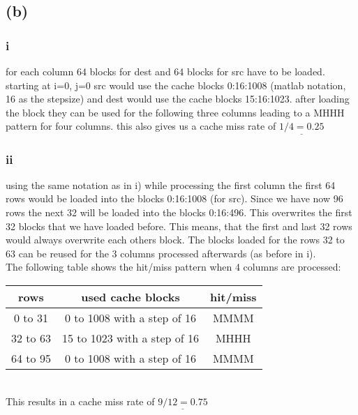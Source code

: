 \documentclass[10pt,a4paper,oneside,notitlepage]{report}
\begin{document}
\subsection*{(b)}
\subsubsection*{i}
for each column 64 blocks for dest and 64 blocks for src have to be loaded. starting at i=0, j=0 src would use the cache blocks 0:16:1008 (matlab notation, 16 as the stepsize) and dest would use the cache blocks 15:16:1023. after loading the block they can be used for the following three columns leading to a MHHH pattern for four columns. this also gives us a cache miss rate of $\underline{1/4=0.25}$

\subsubsection*{ii}
using the same notation as in i) while processing the first column the first 64 rows would be loaded into the blocks 0:16:1008 (for src). Since we have now 96 rows the next 32 will be loaded into the blocks 0:16:496. This overwrites the first 32 blocks that we have loaded before.   This means, that the first and last 32 rows would always overwrite each others block. The blocks loaded for the rows 32 to 63 can be reused for the 3 columns processed afterwards (as before in i). \\
The following table shows the hit/miss pattern when 4 columns are processed:\\
\begin{tabular}{|c|c|c|}
\hline 
\rowcolor{gray!30}
\textbf{rows}  & \textbf{used cache blocks} & \textbf{hit/miss} \\ 
\hline 
0 to 31 & 0 to 1008 with a step of 16 & MMMM \\ 
\hline 
32 to 63 & 15 to 1023 with a step of 16 & MHHH \\ 
\hline 
64 to 95 & 0 to 1008 with a step of 16 & MMMM \\ 
\hline 
\end{tabular}  \\
This results in a cache miss rate of $\underline{9/12=0.75}$
\end{document}
